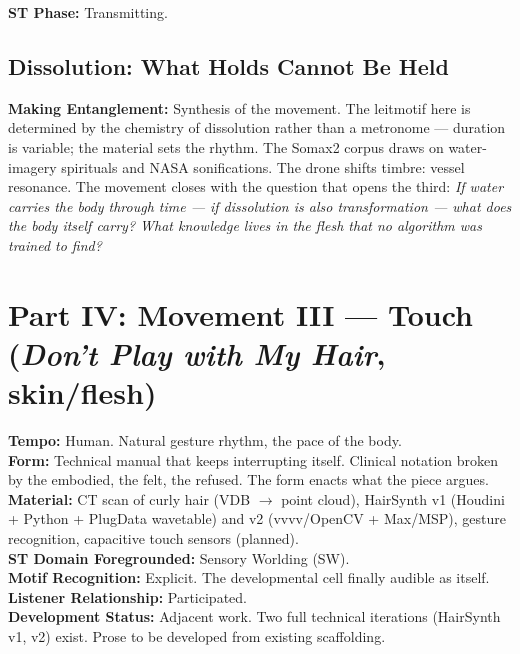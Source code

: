 \noindent\textbf{ST Phase:} Transmitting.

\medskip

\subsection*{Dissolution: What Holds Cannot Be Held}

\noindent\textbf{Making Entanglement:} Synthesis of the movement. The leitmotif here is determined by the chemistry of dissolution rather than a metronome — duration is variable; the material sets the rhythm. The Somax2 corpus draws on water-imagery spirituals and NASA sonifications. The drone shifts timbre: vessel resonance. The movement closes with the question that opens the third: \textit{If water carries the body through time — if dissolution is also transformation — what does the body itself carry? What knowledge lives in the flesh that no algorithm was trained to find?}

\bigskip


\section*{Part IV: Movement III --- Touch (\textit{Don't Play with My Hair}, skin/flesh)}

\noindent\textbf{Tempo:} Human. Natural gesture rhythm, the pace of the body.\\
\noindent\textbf{Form:} Technical manual that keeps interrupting itself. Clinical notation broken by the embodied, the felt, the refused. The form enacts what the piece argues.\\
\noindent\textbf{Material:} CT scan of curly hair (VDB $\to$ point cloud), HairSynth v1 (Houdini + Python + PlugData wavetable) and v2 (vvvv/OpenCV + Max/MSP), gesture recognition, capacitive touch sensors (planned).\\
\noindent\textbf{ST Domain Foregrounded:} Sensory Worlding (SW).\\
\noindent\textbf{Motif Recognition:} Explicit. The developmental cell finally audible as itself.\\
\noindent\textbf{Listener Relationship:} Participated.\\
\noindent\textbf{Development Status:} Adjacent work. Two full technical iterations (HairSynth v1, v2) exist. Prose to be developed from existing scaffolding.

